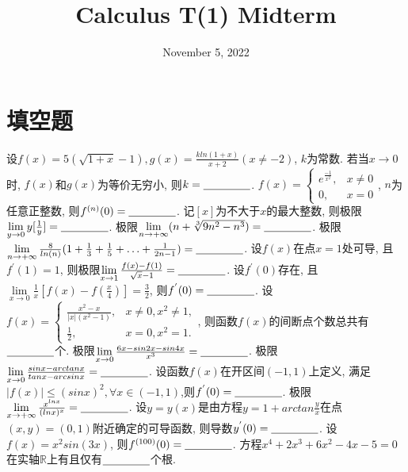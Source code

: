 \documentclass{exam}
\title{Calculus T(1) Midterm}
\date{November 5, 2022}
\begin{document}
\maketitle
\section{填空题}
\begin{questions}
    \question[3]设$f(x)=5(\sqrt{1+x}-1), g(x)=\frac{k ln(1+x)}{x+2} (x \neq -2)$, $k$为常数. 若当$x \rightarrow 0$时, $f(x)$和$g(x)$为等价无穷小, 则$k= \underline{\hspace{1.5cm}}$.
    \question[3]$f(x)=
    \begin{cases}
        e^{\frac{-1}{x^2}},& x \neq 0 \\
        0,& x = 0
    \end{cases}$, $n$为任意正整数, 则$f^{(n)}(0)= \underline{\hspace{1.5cm}}$.
    \question[3]记$[x]$为不大于$x$的最大整数, 则极限$\lim\limits_{y \to 0} y[\frac{1}{y}]= \underline{\hspace{1.5cm}}$.
    \question[3]极限$\lim\limits_{n \to +\infty} (n+\sqrt[3]{9n^2-n^3})= \underline{\hspace{1.5cm}}$.
    \question[3]极限$\lim\limits_{n \to +\infty} \frac{8}{ln(n)}(1+\frac{1}{3}+\frac{1}{5}+\ldots+\frac{1}{2n-1})=\underline{\hspace{1.5cm}}$.
    \question[3]设$f(x)$在点$x=1$处可导, 且$f^{'}(1)=1$, 则极限$\lim\limits_{x \to 1} \frac{f(x)-f(1)}{\sqrt{x}-1}=\underline{\hspace{1.5cm}}$.
    \question[3]设$f^{'}(0)$存在, 且$\lim\limits_{x \to 0} \frac{1}{x}[f(x)-f(\frac{x}{4})]=\frac{3}{2}$, 则$f^{'}(0)=\underline{\hspace{1.5cm}}$.
    \question[3]设$f(x)=
    \begin{cases}
        \frac{x^2-x}{|x|(x^2-1)},& x \neq 0, x^2 \neq 1, \\
        \frac{1}{2},& x=0, x^2=1.
    \end{cases}$, 则函数$f(x)$的间断点个数总共有$\underline{\hspace{1.5cm}}$个.
    \question[3]极限$\lim\limits_{x \to 0} \frac{6x-sin 2x-sin 4x}{x^3}=\underline{\hspace{1.5cm}}$.
    \question[3]极限$\lim\limits_{x \to 0} \frac{sin x-arctan x}{tan x-arcsin x}=\underline{\hspace{1.5cm}}$.
    \question[3]设函数$f(x)$在开区间$(-1, 1)$上定义, 满足$|f(x)| \leq (sinx)^2 , \forall x \in (-1, 1)$,则$f^{'}(0)=\underline{\hspace{1.5cm}}$.
    \question[3]极限$\lim\limits_{x \to +\infty} \frac{x^{lnx}}{(lnx)^x}=\underline{\hspace{1.5cm}}$.
    \question[3]设$y=y(x)$是由方程$y=1+arctan \frac{y}{x}$在点$(x,y)=(0,1)$附近确定的可导函数, 则导数$y^{'}(0)=\underline{\hspace{1.5cm}}$.
    \question[3]设$f(x)=x^2sin(3x)$, 则$f^{(100)}(0)=\underline{\hspace{1.5cm}}$.
    \question[3]方程$x^4+2x^3+6x^2-4x-5=0$在实轴$\mathbb{R}$上有且仅有$\underline{\hspace{1.5cm}}$个根.
\end{questions}
\end{document}

